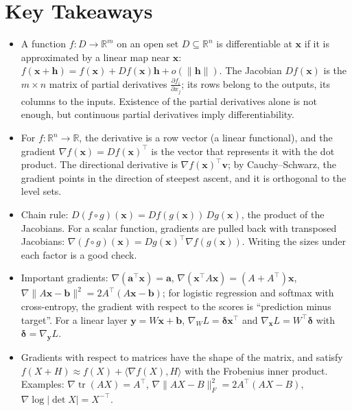 \documentclass[11pt]{article}
\newcommand{\norm}[1]{\lVert #1 \rVert}
\newcommand{\ip}[2]{\langle #1, #2 \rangle}
\theoremstyle{definition}
\theoremstyle{plain}
\theoremstyle{remark}
\DeclareMathOperator{\tr}{tr}
\begin{document}
\section{Key Takeaways}
\begin{itemize}[leftmargin=*]
    \item A function $f: D \to \mathbb{R}^m$ on an open set $D \subseteq \mathbb{R}^n$ is differentiable at $\mathbf{x}$ if it is approximated by a linear map near $\mathbf{x}$: $f(\mathbf{x} + \mathbf{h}) = f(\mathbf{x}) + Df(\mathbf{x})\mathbf{h} + o(\norm{\mathbf{h}})$. The Jacobian $Df(\mathbf{x})$ is the $m \times n$ matrix of partial derivatives $\frac{\partial f_i}{\partial x_j}$; its rows belong to the outputs, its columns to the inputs. Existence of the partial derivatives alone is not enough, but continuous partial derivatives imply differentiability.
    \item For $f: \mathbb{R}^n \to \mathbb{R}$, the derivative is a row vector (a linear functional), and the gradient $\nabla f(\mathbf{x}) = Df(\mathbf{x})^\top$ is the vector that represents it with the dot product. The directional derivative is $\nabla f(\mathbf{x})^\top\mathbf{v}$; by Cauchy--Schwarz, the gradient points in the direction of steepest ascent, and it is orthogonal to the level sets.
    \item Chain rule: $D(f \circ g)(\mathbf{x}) = Df(g(\mathbf{x}))\,Dg(\mathbf{x})$, the product of the Jacobians. For a scalar function, gradients are pulled back with transposed Jacobians: $\nabla(f \circ g)(\mathbf{x}) = Dg(\mathbf{x})^\top\nabla f(g(\mathbf{x}))$. Writing the sizes under each factor is a good check.
    \item Important gradients: $\nabla(\mathbf{a}^\top\mathbf{x}) = \mathbf{a}$, $\nabla(\mathbf{x}^\top A\mathbf{x}) = (A + A^\top)\mathbf{x}$, $\nabla\norm{A\mathbf{x} - \mathbf{b}}^2 = 2A^\top(A\mathbf{x} - \mathbf{b})$; for logistic regression and softmax with cross-entropy, the gradient with respect to the scores is ``prediction minus target''. For a linear layer $\mathbf{y} = W\mathbf{x} + \mathbf{b}$, $\nabla_W L = \boldsymbol{\delta}\mathbf{x}^\top$ and $\nabla_{\mathbf{x}} L = W^\top\boldsymbol{\delta}$ with $\boldsymbol{\delta} = \nabla_{\mathbf{y}} L$.
    \item Gradients with respect to matrices have the shape of the matrix, and satisfy $f(X + H) \approx f(X) + \ip{\nabla f(X)}{H}$ with the Frobenius inner product. Examples: $\nabla\tr(AX) = A^\top$, $\nabla\norm{AX - B}_F^2 = 2A^\top(AX - B)$, $\nabla\log|\det X| = X^{-\top}$.

\end{itemize}
\end{document}
